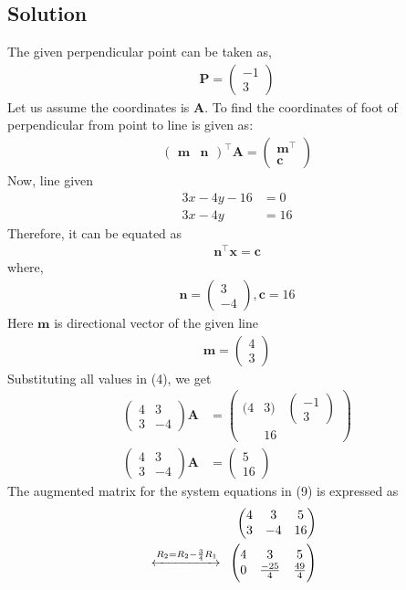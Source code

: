 \documentclass[12pt]{article}
\let\vec\mathbf
\newcommand{\myvec}[1]{\ensuremath{\begin{pmatrix}#1\end{pmatrix}}}
\let\vec\mathbf
\begin{document}
\begin{enumerate}
\section{Solution}
The given perpendicular point can be taken as,
\begin{align}
 \vec{P}=\myvec{
-1\\
3
}
\end{align}
Let us assume the coordinates is $\vec{A}$.
To find the coordinates of foot of perpendicular from point to line is given as:
\begin{align}
\myvec{
\vec{m}&\vec{n}
}^\top \vec{A} = \myvec{
\vec{m}^\top\\
\vec{c}
}
\end{align}
Now, line given 
\begin{align}
3x-4y-16 &=0\\
3x-4y&=16
\end{align}
Therefore, it can be equated as
\begin{align}
\vec{n}^\top \vec{x} = \vec{c}      \label{4}
\end{align}
where,
\begin{align}
\vec{n}=\myvec{
3\\
-4
}, \vec{c}=16
\end{align}
Here $\vec{m}$ is directional vector of the given line
\begin{align}
\vec{m}=\myvec{
4\\3}
\end{align}
Substituting all values in (4), we get
\begin{align}
\myvec
{4&3\\3&-4}\vec{A}&=\myvec{(4&3)&\myvec{-1\\3}\\&16}\\
\myvec
{4&3\\3&-4}\vec{A}&=\myvec{5\\16}  \label{9}
\end{align}
The augmented matrix for the system equations in (9) is expressed as
\begin{align}
  \begin{array}{rr|r}
  \myvec{
   4 &  3  & 5\\
   3 & -4  & 16} 
  \end{array}
\\
  \xleftrightarrow[]{R_2=R_2-\frac{3}{4}R_1}
  \begin{array}{cc|c}
  \myvec{
  4 & 3 & 5\\
  0 & \frac{-25}{4} & \frac{49}{4}} 

\end{array}
\end{align}
\end{enumerate}
\end{document}
